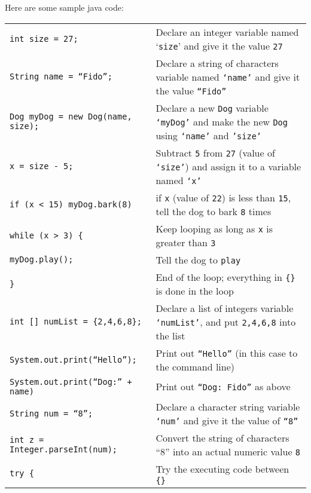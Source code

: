 \documentclass{tufte-handout}
\begin{document}
    Here are some sample java code:
    \begin{center}
        \begin{tabular}{l p{6cm}}
            \texttt{int size = 27;} & Declare an integer variable named `\texttt{size}' and give it the value \texttt{27} \\ [1ex]
            \texttt{String name = ``Fido'';} & Declare a string of characters variable named \texttt{`name'} and give it the value \texttt{``Fido''} \\ [1ex]
            \texttt{Dog myDog = new Dog(name, size);} & Declare a new \texttt{Dog} variable \texttt{`myDog'} and make the new \texttt{Dog} using \texttt{`name'} and \texttt{'size'} \\ [1ex]
            \texttt{x = size - 5;} & Subtract \texttt{5} from \texttt{27} (value of \texttt{`size'}) and assign it to a variable named \texttt{`x'} \\ [1ex]
            \texttt{if (x < 15) myDog.bark(8)} & if \texttt{x} (value of \texttt{22}) is less than \texttt{15}, tell the dog to bark \texttt{8} times \\ [1ex]
            \texttt{while (x > 3) \{ } & Keep looping as long as \texttt{x} is greater than \texttt{3} \\ [1ex]
            \hspace{3mm}\texttt{myDog.play();} & Tell the dog to \texttt{play} \\ [1ex]
            \texttt{\}} & End of the loop; everything in \texttt{\{\}} is done in the loop \\ [1ex]
            \texttt{int [] numList = \{2,4,6,8\};} & Declare a list of integers variable \texttt{`numList'}, and put \texttt{2,4,6,8} into the list \\ [1ex]
            \texttt{System.out.print(``Hello'');} & Print out \texttt{``Hello''} (in this case to the command line) \\ [1ex]
            \texttt{System.out.print(``Dog:'' + name)} & Print out \texttt{``Dog: Fido''} as above \\ [1ex]
            \texttt{String num = ``8'';} & Declare a character string variable \texttt{`num'} and give it the value of \texttt{``8''} \\ [1ex]
            \texttt{int z = Integer.parseInt(num);} & Convert the string of characters ``8'' into an actual numeric value \texttt{8} \\ [1ex]
            \texttt{try \{} & Try the executing code between \texttt{\{\}} \\ [1ex]

\end{tabular}
\end{center}
\end{document}
